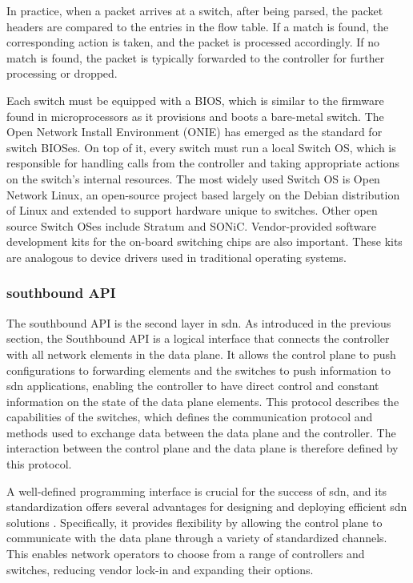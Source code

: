In practice, when a packet arrives at a switch, after being parsed, the packet headers are compared to the entries in the flow table. If a match is found, the corresponding action is taken, and the packet is processed accordingly. If no match is found, the packet is typically forwarded to the controller for further processing or dropped.

Each switch must be equipped with a BIOS, which is similar to the firmware found in microprocessors as it provisions and boots a bare-metal switch. The Open Network Install Environment (ONIE) has emerged as the standard for switch BIOSes\cite{peterson_software-defined_2021}. On top of it, every switch must run a local Switch OS, which is responsible for handling calls from the controller and taking appropriate actions on the switch's internal resources. The most widely used Switch OS is Open Network Linux, an open-source project based largely on the Debian distribution of Linux and extended to support hardware unique to switches\cite{peterson_software-defined_2021}. Other open source Switch OSes include Stratum and SONiC\cite{isto para aqui}. Vendor-provided software development kits for the on-board switching chips are also important. These kits are analogous to device drivers used in traditional operating systems. \cite{peterson_software-defined_2021}


\subsubsection{southbound API} %

The southbound API is the second layer in \gls{sdn}. As introduced in the previous section, the Southbound API is a logical interface that connects the controller with all network elements in the data plane\cite{thyagaturu_software_2016}. It allows the control plane to push configurations to forwarding elements and the switches to push information to \gls{sdn} applications, enabling the controller to have direct control and constant information on the state of the data plane elements. 
This protocol describes the capabilities of the switches, which defines the communication protocol and methods used to exchange data between the data plane and the controller. The interaction between the control plane and the data plane is therefore defined by this protocol\cite{kreutz_software-defined_2015}. 

A well-defined programming interface is crucial for the success of \gls{sdn}, and its standardization offers several advantages for designing and deploying efficient \gls{sdn} solutions\cite{latif_comprehensive_2020} \cite{kreutz_software-defined_2015}. Specifically, it provides flexibility by allowing the control plane to communicate with the data plane through a variety of standardized channels. This enables network operators to choose from a range of controllers and switches, reducing vendor lock-in and expanding their options.


